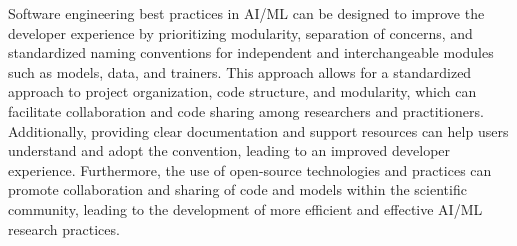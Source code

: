 Software engineering best practices in AI/ML can be designed to improve the developer experience by prioritizing modularity, separation of concerns, and standardized naming conventions for independent and interchangeable modules such as models, data, and trainers. This approach allows for a standardized approach to project organization, code structure, and modularity, which can facilitate collaboration and code sharing among researchers and practitioners. Additionally, providing clear documentation and support resources can help users understand and adopt the convention, leading to an improved developer experience. Furthermore, the use of open-source technologies and practices can promote collaboration and sharing of code and models within the scientific community, leading to the development of more efficient and effective AI/ML research practices.


